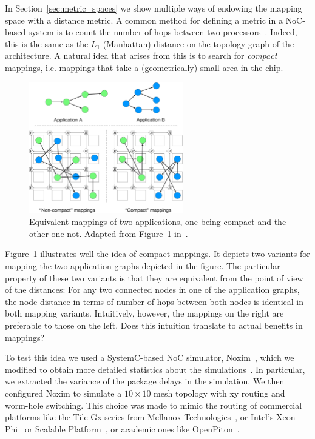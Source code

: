In Section~\ref{sec:metric_spaces} we show multiple ways of endowing the mapping space with a distance metric.
A common method for defining a metric in a \ac{NoC}-based system is to count the number of hops between two processors~\cite{singh2010communication,schwarzer2017symmetry}.
Indeed, this is the same as the $L_1$ (Manhattan) distance on the topology graph of the architecture.
A natural idea that arises from this is to search for \emph{compact} mappings, i.e. mappings that take a (geometrically) small area in the chip.


\begin{figure}[th]
	\centering
	\includegraphics[width=0.6\textwidth]{figures/compact_intro.pdf}
	\caption{Equivalent mappings of two applications, one being compact and the other one not. Adapted from Figure~1 in~\cite{goens_samos19}.}
	\label{fig:compact_intro}
\end{figure}

Figure~\ref{fig:compact_intro} illustrates well the idea of compact mappings.
It depicts two variants for mapping the two application graphs depicted in the figure.
The particular property of these two variants is that they are equivalent from the point of view of the distances:
For any two connected nodes in one of the application graphs, the node distance in terms of number of hops between both nodes is identical in both mapping variants.
Intuitively, however, the mappings on the right are preferable to those on the left. 
Does this intuition translate to actual benefits in mappings?

To test this idea we used a SystemC-based \ac{NoC} simulator, Noxim~\cite{noxim}, which we modified to obtain more detailed statistics about the simulations~\cite{goens_samos19}.
In particular, we extracted the variance of the package delays in the simulation. 
We then configured Noxim to simulate a $10 \times 10$ mesh topology with xy routing and worm-hole switching. 
This choice was made to mimic the routing of commercial platforms like the Tile-Gx series from Mellanox Technologies~\cite{technologies2015-tile-gx36-processor,technologies2015-tile-gx72-processor}, or Intel's Xeon Phi~\cite{tam2018-skylake-sp} or Scalable Platform~\cite{sodani2016knights-landing}, or academic ones like OpenPiton~\cite{balkind2016-openpiton}.

